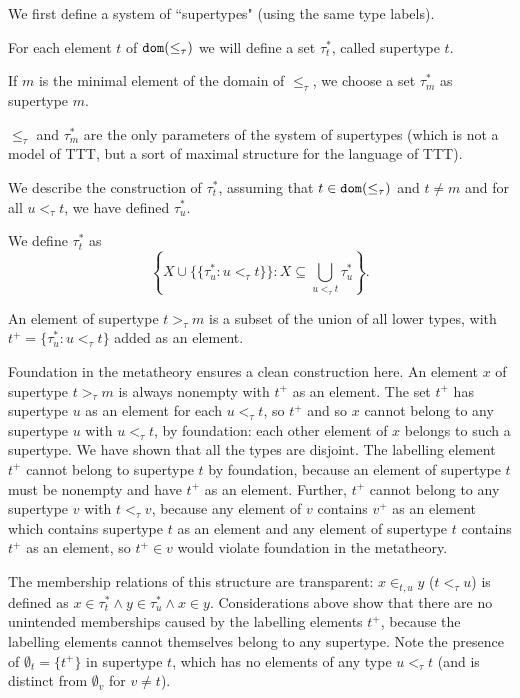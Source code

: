 \documentclass{article}
\theoremstyle{definition}
\theoremstyle{remark}
\begin{document}
We first define a system of ``supertypes" (using the same type labels).

For each element $t$ of ${\tt dom}(\leq_\tau)$ we will define a set $\tau^*_t$, called supertype $t$.

If $m$ is the minimal element of the domain of $\leq_\tau$, we choose a set $\tau^*_m$ as supertype $m$.

$\leq_\tau$ and $\tau^*_m$ are the only parameters of the system of supertypes (which is not a model of TTT, but a sort of maximal structure for the language of TTT).

We describe the construction of $\tau^*_t$, assuming that $t \in {\tt dom}(\leq_\tau)$ and $t \neq m$ and for all $u <_\tau t$, we have
defined $\tau^*_u$.

We define $\tau^*_t$ as $$\left\{X \cup \{\{\tau^*_u:u <_\tau t\}\}:X \subseteq \bigcup_{u <_\tau t}\tau^*_u\right\}.$$

An element of supertype $t>_\tau m$ is a subset of the union of all lower types, with $t^+ = \{\tau^*_u:u <_\tau t\}$ added as an element.

Foundation in the metatheory ensures a clean construction here.  An element $x$ of supertype $t>_\tau m$ is always nonempty with $t^+$ as an element.  The set $t^+$ has supertype $u$ as an element for each $u <_\tau t$, so $t^+$ and so $x$  cannot belong to any supertype $u$ with $u <_\tau t$, by foundation:  each other element of $x$ belongs to such a supertype.  We have shown that all the types are disjoint.  The labelling element $t^+$ cannot belong to supertype $t$ by foundation, because an element of supertype $t$ must be nonempty and have $t^+$ as an element.  Further, $t^+$ cannot belong to any supertype $v$ with $t <_\tau v$, because any element of $v$ contains $v^+$ as an element which contains supertype $t$ as an element and any element of supertype $t$ contains $t^+$ as an element, so $t^+ \in v$ would violate foundation in the metatheory.

The membership relations of this structure are transparent:  $x \in_{t,u} y$ ($t <_\tau u$) is defined as
$x \in \tau^*_t \wedge y \in \tau^*_u \wedge x \in y$.   Considerations above show that there are no unintended memberships caused by the labelling elements $t^+$, because the labelling elements cannot themselves belong to any supertype.  Note the presence of $\emptyset_t = \{t^+\}$ in supertype $t$, which has no elements of any type $u <_\tau t$ (and is distinct from $\emptyset_v$ for $v \neq t$).
\end{document}
